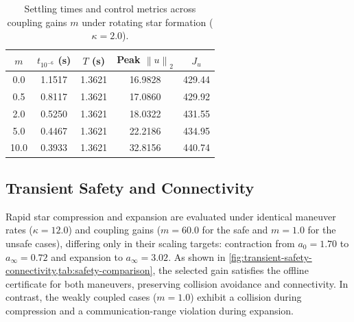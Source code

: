 \documentclass[letterpaper,10pt,conference]{ieeeconf}
\newcommand{\norm}[1]{\left\lVert #1 \right\rVert}
\begin{document}
\begin{table}[t]
\centering
\caption{Settling times and control metrics across coupling gains $m$ under rotating star formation ($\kappa=2.0$).}
\label{tab:gain-sweep}
\small
\begin{tabular}{ccccc}
\toprule
$m$ & $t_{10^{-6}}$ (s) & $T$ (s) & Peak $\norm{u}_2$ & $J_u$\\
\midrule
 0.0 & 1.1517 & 1.3621 & 16.9828 & 429.44 \\
 0.5 & 0.8117 & 1.3621 & 17.0860 & 429.92 \\
 2.0 & 0.5250 & 1.3621 & 18.0322 & 431.55 \\
 5.0 & 0.4467 & 1.3621 & 22.2186 & 434.95 \\
10.0 & 0.3933 & 1.3621 & 32.8156 & 440.74 \\
\bottomrule
\end{tabular}
\end{table}

\subsection{Transient Safety and Connectivity}
Rapid star compression and expansion are evaluated under identical maneuver rates ($\kappa=12.0$) and coupling gains ($m=60.0$ for the safe and $m=1.0$ for the unsafe cases), differing only in their scaling targets: contraction from $a_0=1.70$ to $a_\infty=0.72$ and expansion to $a_\infty=3.02$. As shown in \cref{fig:transient-safety-connectivity,tab:safety-comparison}, the selected gain satisfies the offline certificate for both maneuvers, preserving collision avoidance and connectivity. In contrast, the weakly coupled cases ($m=1.0$) exhibit a collision during compression and a communication-range violation during expansion.
\end{document}

